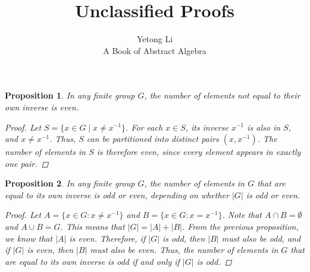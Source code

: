 \documentclass[12pt]{article}
\newtheorem{proposition}{Proposition}
\begin{document}

\title{Unclassified Proofs}
\author{Yetong Li \\ A Book of Abstract Algebra}

\maketitle


\begin{proposition}
  In any finite group $G$, the number of elements not equal to their own inverse is even.
  \begin{proof}
    Let $S = \{ x \in G \mid x \neq x^{-1} \}$.
    For each $x \in S$, its inverse $x^{-1}$ is also in $S$, and $x \neq x^{-1}$.
    Thus, $S$ can be partitioned into distinct pairs $(x, x^{-1})$.
    The number of elements in $S$ is therefore even, since every element appears in exactly one pair.
  \end{proof}
\end{proposition}


\begin{proposition}
  In any finite group $G$, the number of elements in $G$ that are equal to its own inverse is odd or even,
  depending on whether $|G|$ is odd or even.
  \begin{proof}
    Let $A = \{x \in G : x \neq x^{-1}\}$ and $B = \{x \in G : x = x^{-1}\}$.
    Note that $A \cap B = \emptyset$ and $A \cup B = G$. This means that $|G| = |A| + |B|$.
    From the previous proposition, we know that $|A|$ is even.
    Therefore, if $|G|$ is odd, then $|B|$ must also be odd, and if $|G|$ is even, then $|B|$ must also be even.
    Thus, the number of elements in $G$ that are equal to its own inverse is odd if and only if $|G|$ is odd.
  \end{proof}
\end{proposition}
\end{document}
